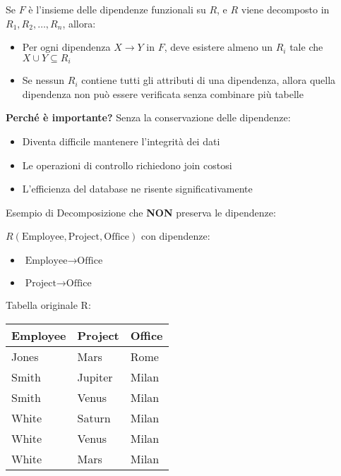 	Se $F$ è l'insieme delle dipendenze funzionali su $R$, e $R$ viene decomposto in $R_1, R_2, \ldots, R_n$, allora:
	\begin{itemize}
		\item Per ogni dipendenza $X \rightarrow Y$ in $F$, deve esistere almeno un $R_i$ tale che $X \cup Y \subseteq R_i$
		\item Se nessun $R_i$ contiene tutti gli attributi di una dipendenza, allora quella dipendenza non può essere verificata senza combinare più tabelle
	\end{itemize}
	
	\textbf{Perché è importante?} Senza la conservazione delle dipendenze:
	\begin{itemize}
		\item Diventa difficile mantenere l'integrità dei dati
		\item Le operazioni di controllo richiedono join costosi
		\item L'efficienza del database ne risente significativamente
	\end{itemize}
	
	\noindent Esempio di Decomposizione che \textbf{NON} preserva le dipendenze:

	$R(\text{Employee}, \text{Project}, \text{Office})$ con dipendenze:

	\begin{itemize}
		\item $\text{Employee} \rightarrow \text{Office}$
		\item $\text{Project} \rightarrow \text{Office}$
	\end{itemize}

	\noindent Tabella originale R:
	\begin{center}
	\begin{tabular}{|l|l|l|}
		\hline
		\textbf{Employee} & \textbf{Project} & \textbf{Office} \\ \hline
		Jones & Mars & Rome \\ \hline
		Smith & Jupiter & Milan \\ \hline
		Smith & Venus & Milan \\ \hline
		White & Saturn & Milan \\ \hline
		White & Venus & Milan \\ \hline
		White & Mars & Milan \\ \hline
	\end{tabular}
	\end{center}

